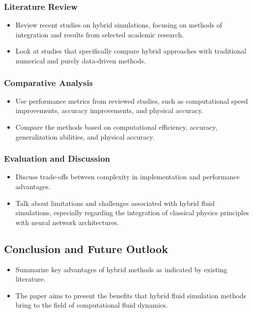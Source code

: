\subsubsection*{Literature Review}
\begin{itemize}
    \item 
	Review recent studies on hybrid simulations, focusing on 
    methods of integration and results from selected academic research.

	\item 
    Look at studies that specifically compare hybrid approaches with traditional 
    numerical and purely data-driven methods.
\end{itemize}

\subsubsection*{Comparative Analysis}
\begin{itemize}
    \item 
	Use performance metrics from reviewed studies, such as computational speed 
    improvements, accuracy improvements, and physical accuracy.

	\item 
    Compare the methods based on computational efficiency, accuracy, 
    generalization abilities, and physical accuracy.
\end{itemize}

\subsubsection*{Evaluation and Discussion}
\begin{itemize}
    \item 
    Discuss trade-offs between complexity in implementation and performance advantages.

	\item 
    Talk about limitations and challenges associated with hybrid fluid simulations, 
    especially regarding the integration of classical physics principles with neural 
    network architectures.
\end{itemize}

\subsection*{Conclusion and Future Outlook}
\begin{itemize}
    \item 
    Summarize key advantages of hybrid methods as indicated by existing literature.

    
	\item 
    The paper aims to present the benefits that hybrid fluid 
    simulation methods bring to the field of computational fluid dynamics.
\end{itemize}